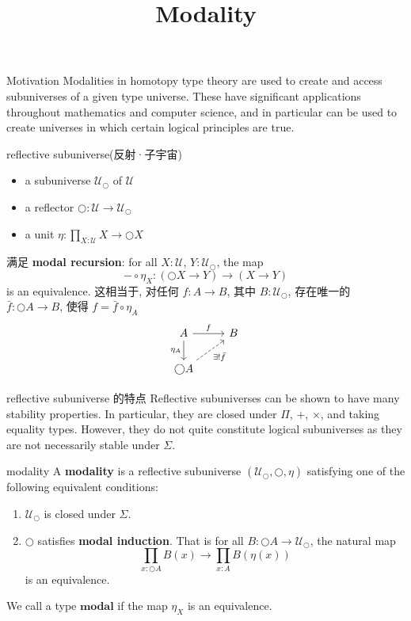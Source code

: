 \documentclass{beamer}
\title{Modality}
\date{}
\newcommand{\OO}{\bigcirc}
\newcommand{\UU}{\mathcal{U}}
\begin{document}
\begin{frame}
    \titlepage
\end{frame}

\begin{frame}{Motivation\cite{williams2025}}
Modalities in homotopy type theory are used to create and access subuniverses of a given type universe. These have significant applications throughout mathematics and computer science, and in particular can be used to create universes in which certain logical principles are true.
\end{frame}

\begin{frame}{reflective subuniverse(反射·子宇宙)}
\begin{itemize}
  \item a subuniverse $\UU_\OO$ of $\UU$
  \item a reflector $\OO : \UU \to \UU_\OO$
  \item a unit $\eta : \prod_{X:\UU}X \to \OO X$
\end{itemize}
满足 \textbf{modal recursion}: for all $X:\UU$, $Y:\UU_\OO$, the map
\[
-\circ\eta_{X} : (\OO X \to Y) \to (X \to Y)
\]
is an equivalence. 这相当于, 对任何 $f: A \to B$, 其中 $B: \UU_\OO$, 存在唯一的 $\bar{f} : \OO A \to B$, 使得 $f = \bar{f}\circ\eta_A$
\[
\begin{tikzcd}
A \arrow[d,"\eta_A"']\arrow[r,"f"] & B \\
\OO A \arrow[ur,dashed,"{\exists !\bar{f}}"']
\end{tikzcd}
\]
\end{frame}

\begin{frame}{reflective subuniverse 的特点}
Reflective subuniverses can be shown to have many stability properties. 
In particular, they are closed under $\Pi$, $+$, $\times$, and taking equality types.
However, they do not quite constitute logical subuniverses as they are not necessarily stable under $\Sigma$.
\end{frame}

\begin{frame}{modality}
   A \textbf{modality} is a reflective subuniverse $(\UU_\OO, \OO, \eta)$ satisfying one of the following equivalent conditions:
    \begin{enumerate}
        \item $\UU_\OO$ is closed under $\Sigma$.
        \item $\OO$ satisfies \textbf{modal induction}. That is for all $B : \OO A \to \UU_\OO$, the natural map 
              \[ \prod_{x : \OO A} B(x) \to \prod_{x : A} B(\eta(x))  \]
              is an equivalence.
    \end{enumerate}

We call a type $\textbf{modal}$ if the map $\eta_X$ is an equivalence.
\end{frame}
\end{document}
